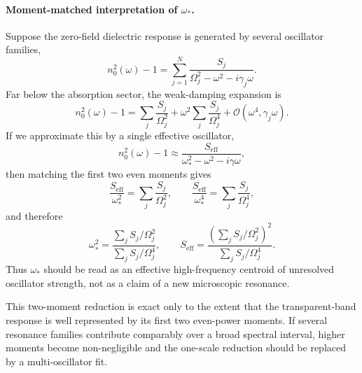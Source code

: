 \documentclass[11pt,a4paper]{article}
\begin{document}
    \paragraph{Moment-matched interpretation of $\omega_\ast$.}
    Suppose the zero-field dielectric response is generated by several oscillator families,
    \begin{equation}
        n_0^2(\omega)-1
        =
        \sum_{j=1}^{N}
        \frac{S_j}{\Omega_j^2-\omega^2-i\gamma_j\omega}.
        \label{eq:multiosc}
    \end{equation}
    Far below the absorption sector, the weak-damping expansion is
    \begin{equation}
        n_0^2(\omega)-1
        =
        \sum_j \frac{S_j}{\Omega_j^2}
        +
        \omega^2 \sum_j \frac{S_j}{\Omega_j^4}
        + \mathcal{O}(\omega^4,\gamma_j\omega).
    \end{equation}
    If we approximate this by a single effective oscillator,
    \begin{equation}
        n_0^2(\omega)-1
        \approx
        \frac{S_{\mathrm{eff}}}{\omega_\ast^2-\omega^2-i\gamma\omega},
    \end{equation}
    then matching the first two even moments gives
    \begin{equation}
        \frac{S_{\mathrm{eff}}}{\omega_\ast^2}
        =
        \sum_j \frac{S_j}{\Omega_j^2},
        \qquad
        \frac{S_{\mathrm{eff}}}{\omega_\ast^4}
        =
        \sum_j \frac{S_j}{\Omega_j^4},
    \end{equation}
    and therefore
    \begin{equation}
        \boxed{
        \omega_\ast^2
        =
        \frac{\displaystyle \sum_j S_j/\Omega_j^2}
             {\displaystyle \sum_j S_j/\Omega_j^4}
        },
        \qquad
        \boxed{
        S_{\mathrm{eff}}
        =
        \frac{\left(\displaystyle \sum_j S_j/\Omega_j^2\right)^2}
             {\displaystyle \sum_j S_j/\Omega_j^4}
        }.
        \label{eq:momentmatch}
    \end{equation}
    Thus $\omega_\ast$ should be read as an effective high-frequency centroid of unresolved oscillator strength, not as a claim of a new microscopic resonance.
    
    This two-moment reduction is exact only to the extent that the transparent-band response is well represented by its first two even-power moments. If several resonance families contribute comparably over a broad spectral interval, higher moments become non-negligible and the one-scale reduction should be replaced by a multi-oscillator fit.
    
\end{document}
